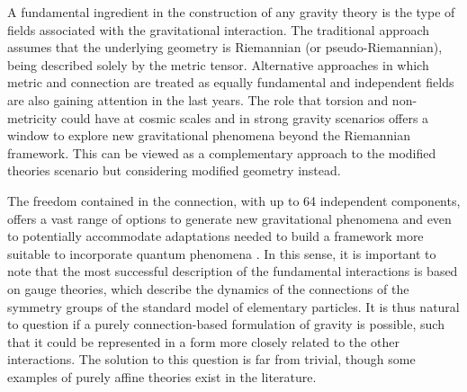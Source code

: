 \documentclass[epj]{svjour}
\begin{document}
A fundamental ingredient in the construction of any gravity theory is the type of fields associated with the gravitational interaction. The traditional approach assumes that the underlying geometry is Riemannian (or pseudo-Riemannian), being described solely by the metric tensor. Alternative approaches in which metric and connection are treated as equally fundamental and independent fields are also gaining attention in the last years. The role that torsion and non-metricity could have at cosmic scales and in strong gravity scenarios offers a window to explore new gravitational phenomena beyond the Riemannian framework. This can be viewed as a complementary approach to the modified theories scenario but considering modified geometry instead. 

The freedom contained in the connection, with up to 64 independent components, offers a vast range of options to generate new gravitational phenomena and even to potentially accommodate adaptations needed to build a framework more suitable to incorporate quantum phenomena \cite{Hehl:1994ue}. In this sense, it is important to note that the most successful description of the fundamental interactions is based on gauge theories, which describe the dynamics of the connections of the symmetry groups of the standard model of elementary particles. It is thus natural to question if a purely connection-based formulation of gravity is possible, such that it could be represented in a form more closely related to the other interactions. The solution to this question is far from trivial, though some examples of purely affine theories exist in the literature.  
\end{document}
